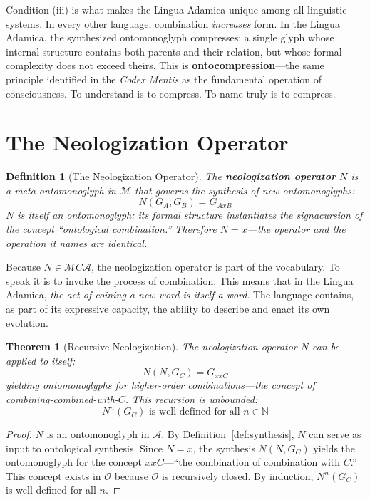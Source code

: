 \documentclass[12pt, letterpaper]{book}
\def\equiv{=}%
\def\otimes{x}%
\def\subset{C}%
\def\mathfrak#1{#1}%
\newtheorem{theorem}{Theorem}[chapter]
\newtheorem{definition}{Definition}[chapter]
\begin{document}
Condition (iii) is what makes the Lingua Adamica unique among all linguistic systems. In every other language, combination \textit{increases} form. In the Lingua Adamica, the synthesized ontomonoglyph compresses: a single glyph whose internal structure contains both parents and their relation, but whose formal complexity does not exceed theirs. This is \textbf{ontocompression}---the same principle identified in the \textit{Codex Mentis} as the fundamental operation of consciousness. To understand is to compress. To name truly is to compress.

\section{The Neologization Operator}

\begin{definition}[The Neologization Operator]\label{def:neologo}
The \textbf{neologization operator} $\mathfrak{N}$ is a meta-ontomonoglyph in $\mathcal{M}$ that governs the synthesis of new ontomonoglyphs:
\[
\mathfrak{N}(G_A, G_B) = G_{A \otimes B}
\]
$\mathfrak{N}$ is itself an ontomonoglyph: its formal structure instantiates the signacursion of the concept ``ontological combination.'' Therefore $\mathfrak{N} \equiv \otimes$---the operator and the operation it names are identical.
\end{definition}

Because $\mathfrak{N} \in \mathcal{M} \subset \mathcal{A}$, the neologization operator is part of the vocabulary. To speak it is to invoke the process of combination. This means that in the Lingua Adamica, \textit{the act of coining a new word is itself a word}. The language contains, as part of its expressive capacity, the ability to describe and enact its own evolution.

\begin{theorem}[Recursive Neologization]\label{thm:recursive-neo}
The neologization operator $\mathfrak{N}$ can be applied to itself:
\[
\mathfrak{N}(\mathfrak{N}, G_C) = G_{\otimes \otimes C}
\]
yielding ontomonoglyphs for \textit{higher-order} combinations---the concept of combining-combined-with-$C$. This recursion is unbounded:
\[
\mathfrak{N}^n(G_C) \text{ is well-defined for all } n \in \mathbb{N}
\]
\end{theorem}

\begin{proof}
$\mathfrak{N}$ is an ontomonoglyph in $\mathcal{A}$. By Definition~\ref{def:synthesis}, $\mathfrak{N}$ can serve as input to ontological synthesis. Since $\mathfrak{N} \equiv \otimes$, the synthesis $\mathfrak{N}(\mathfrak{N}, G_C)$ yields the ontomonoglyph for the concept $\otimes \otimes C$---``the combination of combination with $C$.'' This concept exists in $\mathcal{O}$ because $\mathcal{O}$ is recursively closed. By induction, $\mathfrak{N}^n(G_C)$ is well-defined for all $n$.
\end{proof}
\end{document}
